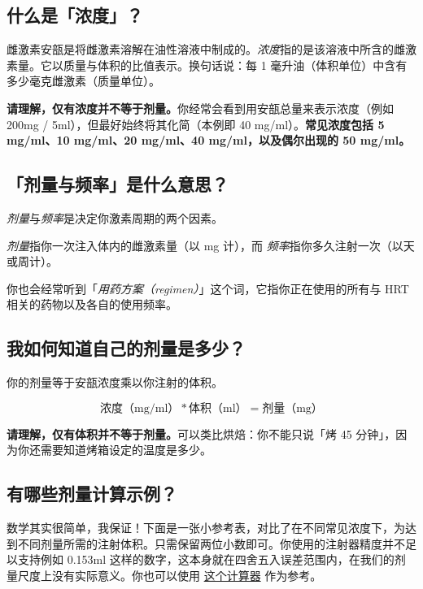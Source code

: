 \documentclass{article}
\begin{document}
\subsection{什么是「浓度」？}

雌激素安瓿是将雌激素溶解在油性溶液中制成的。\textit{浓度}指的是该溶液中所含的雌激素量。它以质量与体积的比值表示。换句话说：每 1 毫升油（体积单位）中含有多少毫克雌激素（质量单位）。

\textbf{请理解，仅有浓度并不等于剂量。}你经常会看到用安瓿总量来表示浓度（例如 200mg / 5ml），但最好始终将其化简（本例即 40 mg/ml）。\textbf{常见浓度包括 5 mg/ml、10 mg/ml、20 mg/ml、40 mg/ml，以及偶尔出现的 50 mg/ml。}

\subsection{「剂量与频率」是什么意思？}

\textit{剂量}与\textit{频率}是决定你激素周期的两个因素。

\textit{剂量}指你一次注入体内的雌激素量（以 mg 计），而 \textit{频率}指你多久注射一次（以天或周计）。

你也会经常听到「\textit{用药方案（regimen）}」这个词，它指你正在使用的所有与 HRT 相关的药物以及各自的使用频率。

\subsection{我如何知道自己的剂量是多少？}

你的剂量等于安瓿浓度乘以你注射的体积。

\[
\text{浓度（mg/ml）} * \text{体积（ml）} = \text{剂量（mg）}
\]

\textbf{请理解，仅有体积并不等于剂量。}可以类比烘焙：你不能只说「烤 45 分钟」，因为你还需要知道烤箱设定的温度是多少。

\subsection{有哪些剂量计算示例？}

数学其实很简单，我保证！下面是一张小参考表，对比了在不同常见浓度下，为达到不同剂量所需的注射体积。只需保留两位小数即可。你使用的注射器精度并不足以支持例如 0.153ml 这样的数字，这本身就在四舍五入误差范围内，在我们的剂量尺度上没有实际意义。你也可以使用 \href{https://hrtcafe.net/Calc/}{这个计算器} 作为参考。
\end{document}
